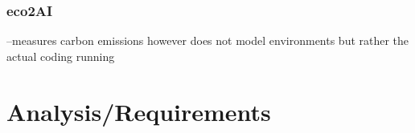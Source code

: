 \documentclass{l4proj}
\begin{document}
\subsection{eco2AI}
--measures carbon emissions however does not model environments but rather the actual coding running

\chapter{Analysis/Requirements}\label{ch:analysis/requirements}


%
\end{document}
